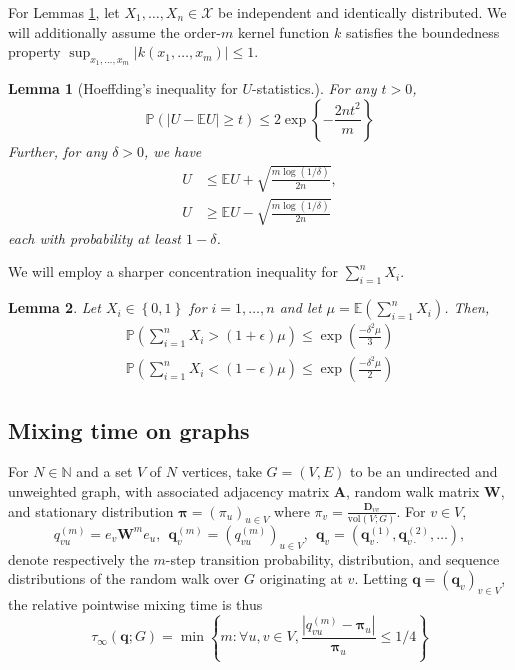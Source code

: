 \documentclass{article}
\newcommand{\set}[1]{\left\{#1\right\}}
\newcommand{\vol}{\mathrm{vol}}
\newcommand{\abs}[1]{\left \lvert #1 \right \rvert}
\newcommand{\1}{\mathbf{1}}
\newcommand{\qbf}{\mathbf{q}}
\newcommand{\pibf}{\bm{\pi}}
\newcommand{\Abf}{\mathbf{A}}
\newcommand{\Wbf}{\mathbf{W}}
\newcommand{\Dbf}{\mathbf{D}}
\newcommand{\Pbb}{\mathbb{P}}
\newcommand{\Ebb}{\mathbb{E}}
\theoremstyle{aldenthm}
\newtheorem{lemma}{Lemma}
\begin{document}
For Lemmas \ref{lem: bounded_difference}, let $X_1, \ldots, X_n \in \mathcal{X}$ be independent and identically distributed. We will additionally assume the order-$m$ kernel function $k$ satisfies the boundedness property $\sup_{x_1, \ldots, x_m} \abs{k(x_1, \ldots, x_m)} \leq 1$. 

\begin{lemma}[Hoeffding's inequality for $U$-statistics.]
	\label{lem: bounded_difference}
	For any $t > 0$,
	\begin{equation*}
	\mathbb{P}(\abs{U - \mathbb{E}U} \geq t) \leq 2 \exp\left\{- \frac{2nt^2}{m}\right\}
	\end{equation*}
	Further, for any $\delta > 0$, we have
	\begin{align*}
	U & \leq \mathbb{E}U + \sqrt{\frac{m \log(1 / \delta)}{2n} }, \\
	U & \geq \mathbb{E}U - \sqrt{\frac{m \log(1 / \delta)}{2n} }
	\end{align*}
	each with probability at least $1 - \delta$. 
\end{lemma}

We will employ a sharper concentration inequality for $\sum_{i = 1}^{n} X_i$.
\begin{lemma}
	\label{lem: multiplicative_Hoeffding}
	Let $X_i \in \set{0,1}$ for $i = 1, \ldots, n$ and let $\mu = \Ebb(\sum_{i = 1}^n X_i)$. Then,
	\begin{align*}
	\Pbb\left(\sum_{i=1}^{n}X_i > (1 + \epsilon) \mu \right) \leq \exp \left(\frac{-\delta^2 \mu}{3}\right) \\
	\Pbb\left(\sum_{i=1}^{n}X_i < (1 - \epsilon) \mu \right) \leq \exp \left(\frac{-\delta^2 \mu}{2}\right)
	\end{align*}
\end{lemma}

\subsection{Mixing time on graphs}
For $N \in \mathbb{N}$ and a set $V$ of $N$ vertices, take $G = (V,E)$ to be an undirected and unweighted graph, with associated adjacency matrix $\Abf$, random walk matrix $\Wbf$, and stationary distribution $\pibf = (\pi_u)_{u \in V}$ where $\pi_v = \frac{\Dbf_{vv}}{\vol(V; G)}$. For $v \in V$, 
\begin{equation}
\label{eqn: random_walk}
q_{vu}^{(m)} = e_v\Wbf^m e_u, ~~ \qbf_{v}^{(m)} = \left(q_{vu}^{(m)}\right)_{u \in V}, ~~ \qbf_v = (\qbf^{(1)}_{v\cdot},\qbf^{(2)}_{v\cdot}, \ldots), 
\end{equation}
denote respectively the $m$-step transition probability, distribution, and sequence distributions of the random walk over $G$ originating at $v$. Letting $\qbf = (\qbf_v)_{v \in V}$, the relative pointwise mixing time is thus
\begin{equation*}
\tau_{\infty}(\qbf; G) = \min\set{m: \forall u,v \in V, \frac{\abs{q_{vu}^{(m)} - \pibf_u}}{\pibf_u} \leq 1/4} 
\end{equation*}
\end{document}
